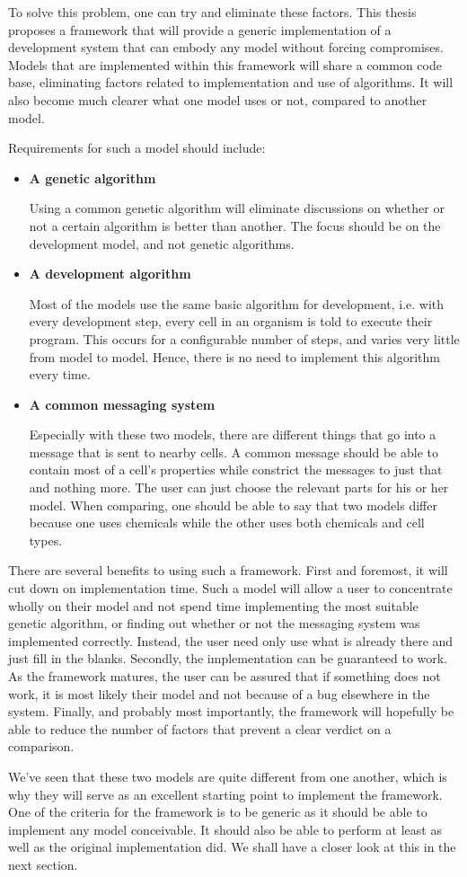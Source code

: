 To solve this problem, one can try and eliminate these factors. This thesis proposes a framework that will provide a generic implementation of a development system that can embody any model without forcing compromises. Models that are implemented within this framework will share a common code base, eliminating factors related to implementation and use of algorithms. It will also become much clearer what one model uses or not, compared to another model.

Requirements for such a model should include:
\begin{itemize}
	\item\textbf{A genetic algorithm}

	Using a common genetic algorithm will eliminate discussions on whether or not a certain algorithm is better than another. The focus should be on the development model, and not genetic algorithms.

	\item\textbf{A development algorithm}

	Most of the models use the same basic algorithm for development, i.e. with every development step, every cell in an organism is told to execute their program. This occurs for a configurable number of steps, and varies very little from model to model. Hence, there is no need to implement this algorithm every time.

	\item\textbf{A common messaging system}

	Especially with these two models, there are different things that go into a message that is sent to nearby cells. A common message should be able to contain most of a cell's properties while constrict the messages to just that and nothing more. The user can just choose the relevant parts for his or her model. When comparing, one should be able to say that two models differ because one uses chemicals while the other uses both chemicals and cell types.
\end{itemize}

There are several benefits to using such a framework. First and foremost, it will cut down on implementation time. Such a model will allow a user to concentrate wholly on their model and not spend time implementing the most suitable genetic algorithm, or finding out whether or not the messaging system was implemented correctly. Instead, the user need only use what is already there and just fill in the blanks. Secondly, the implementation can be guaranteed to work. As the framework matures, the user can be assured that if something does not work, it is most likely their model and not because of a bug elsewhere in the system. Finally, and probably most importantly, the framework will hopefully be able to reduce the number of factors that prevent a clear verdict on a comparison.

We've seen that these two models are quite different from one another, which is why they will serve as an excellent starting point to implement the framework. One of the criteria for the framework is to be generic as it should be able to implement any model conceivable. It should also be able to perform at least as well as the original implementation did. We shall have a closer look at this in the next section.

